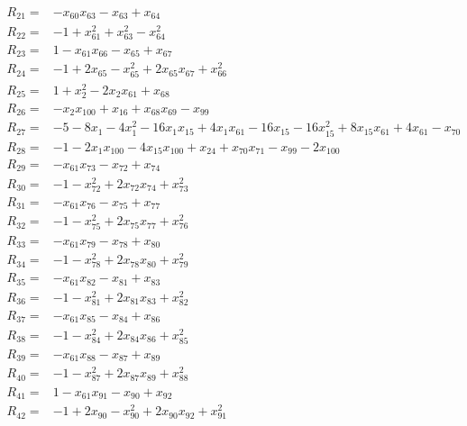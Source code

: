 \begin{align*}
R_{21}={}&-x_{60}x_{63}-x_{63}+x_{64}\\[3pt]
R_{22}={}&-1+x_{61}^{2}+x_{63}^{2}-x_{64}^{2}\\[3pt]
R_{23}={}&1-x_{61}x_{66}-x_{65}+x_{67}\\[3pt]
R_{24}={}&-1+2x_{65}-x_{65}^{2}+2x_{65}x_{67}+x_{66}^{2}\\[3pt]
R_{25}={}&1+x_{2}^{2}-2x_{2}x_{61}+x_{68}\\[3pt]
R_{26}={}&-x_{2}x_{100}+x_{16}+x_{68}x_{69}-x_{99}\\[3pt]
R_{27}={}&-5-8x_{1}-4x_{1}^{2}-16x_{1}x_{15}+4x_{1}x_{61}-16x_{15}-16x_{15}^{2}+8x_{15}x_{61}+4x_{61}-x_{70}\\[3pt]
R_{28}={}&-1-2x_{1}x_{100}-4x_{15}x_{100}+x_{24}+x_{70}x_{71}-x_{99}-2x_{100}\\[3pt]
R_{29}={}&-x_{61}x_{73}-x_{72}+x_{74}\\[3pt]
R_{30}={}&-1-x_{72}^{2}+2x_{72}x_{74}+x_{73}^{2}\\[3pt]
R_{31}={}&-x_{61}x_{76}-x_{75}+x_{77}\\[3pt]
R_{32}={}&-1-x_{75}^{2}+2x_{75}x_{77}+x_{76}^{2}\\[3pt]
R_{33}={}&-x_{61}x_{79}-x_{78}+x_{80}\\[3pt]
R_{34}={}&-1-x_{78}^{2}+2x_{78}x_{80}+x_{79}^{2}\\[3pt]
R_{35}={}&-x_{61}x_{82}-x_{81}+x_{83}\\[3pt]
R_{36}={}&-1-x_{81}^{2}+2x_{81}x_{83}+x_{82}^{2}\\[3pt]
R_{37}={}&-x_{61}x_{85}-x_{84}+x_{86}\\[3pt]
R_{38}={}&-1-x_{84}^{2}+2x_{84}x_{86}+x_{85}^{2}\\[3pt]
R_{39}={}&-x_{61}x_{88}-x_{87}+x_{89}\\[3pt]
R_{40}={}&-1-x_{87}^{2}+2x_{87}x_{89}+x_{88}^{2}\\[3pt]
R_{41}={}&1-x_{61}x_{91}-x_{90}+x_{92}\\[3pt]
R_{42}={}&-1+2x_{90}-x_{90}^{2}+2x_{90}x_{92}+x_{91}^{2}\\[3pt]

\end{align*}
